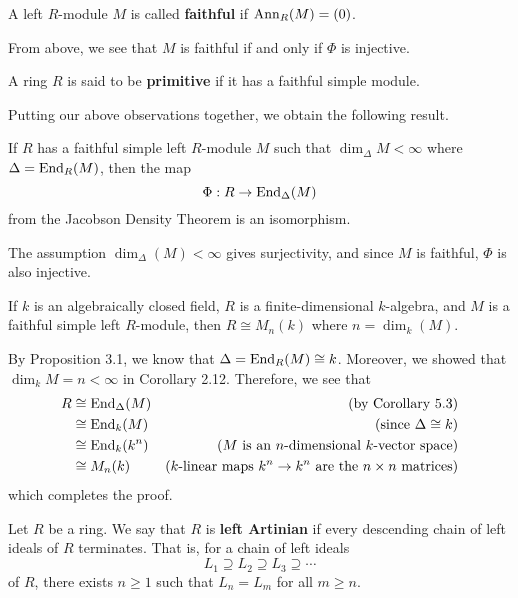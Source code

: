 \begin{defn}
A left $R$-module $M$ is called {\bf faithful} if $\operatorname{Ann}_R(M) = (0)$. 
\end{defn}

From above, we see that $M$ is faithful if and only if $\Phi$ is injective. 

\begin{defn}
A ring $R$ is said to be {\bf primitive} if it has a faithful simple module.
\end{defn}

Putting our above observations together, we obtain the following result. 

\begin{cor}
If $R$ has a faithful simple left $R$-module $M$ such that $\dim_\Delta M < \infty$ where 
$\Delta = \operatorname{End}_R(M)$, then the map 
\[ \Phi : R \to \operatorname{End}_\Delta(M) \]
from the Jacobson Density Theorem is an isomorphism. 
\end{cor}
\begin{pf}
The assumption $\dim_\Delta(M) < \infty$ gives surjectivity, and since $M$ is faithful, 
$\Phi$ is also injective.
\end{pf}

\begin{cor}
If $k$ is an algebraically closed field, $R$ is a finite-dimensional $k$-algebra, and $M$ is a 
faithful simple left $R$-module, then $R \cong M_n(k)$ where $n = \dim_k(M)$. 
\end{cor}
\begin{pf}
By Proposition 3.1, we know that $\Delta = \operatorname{End}_R(M) \cong k$. Moreover, we showed that 
$\dim_k M = n < \infty$ in Corollary 2.12. Therefore, we see that 
\begin{align*}
    R &\cong \operatorname{End}_\Delta(M) & \text{(by Corollary 5.3)} \\
    &\cong \operatorname{End}_k(M) & \text{(since $\Delta \cong k$)} \\
    &\cong \operatorname{End}_k(k^n) & \text{($M$ is an $n$-dimensional $k$-vector space)} \\
    &\cong M_n(k) & \text{($k$-linear maps $k^n \to k^n$ are the $n \times n$ matrices)} 
\end{align*}
which completes the proof.
\end{pf}

\begin{defn}
Let $R$ be a ring. We say that $R$ is {\bf left Artinian} if every descending chain of left ideals of $R$
terminates. That is, for a chain of left ideals 
\[ L_1 \supseteq L_2 \supseteq L_3 \supseteq \cdots \]
of $R$, there exists $n \geq 1$ such that $L_n = L_m$ for all $m \geq n$. 
\end{defn}

